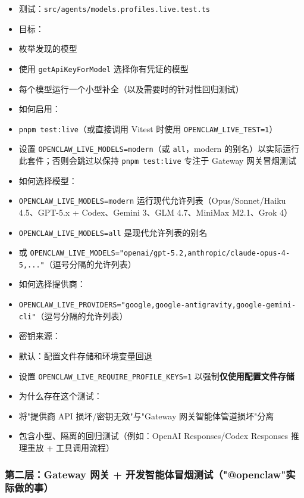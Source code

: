 \begin{itemize}
  \item 测试：\texttt{src/agents/models.profiles.live.test.ts}
  \item 目标：
  \item 枚举发现的模型
  \item 使用 \texttt{getApiKeyForModel} 选择你有凭证的模型
  \item 每个模型运行一个小型补全（以及需要时的针对性回归测试）
  \item 如何启用：
  \item \texttt{pnpm test:live}（或直接调用 Vitest 时使用 \texttt{OPENCLAW\_LIVE\_TEST=1}）
  \item 设置 \texttt{OPENCLAW\_LIVE\_MODELS=modern}（或 \texttt{all}，modern 的别名）以实际运行此套件；否则会跳过以保持 \texttt{pnpm test:live} 专注于 Gateway 网关冒烟测试
  \item 如何选择模型：
  \item \texttt{OPENCLAW\_LIVE\_MODELS=modern} 运行现代允许列表（Opus/Sonnet/Haiku 4.5、GPT-5.x + Codex、Gemini 3、GLM 4.7、MiniMax M2.1、Grok 4）
  \item \texttt{OPENCLAW\_LIVE\_MODELS=all} 是现代允许列表的别名
  \item 或 \texttt{OPENCLAW\_LIVE\_MODELS="openai/gpt-5.2,anthropic/claude-opus-4-5,..."}（逗号分隔的允许列表）
  \item 如何选择提供商：
  \item \texttt{OPENCLAW\_LIVE\_PROVIDERS="google,google-antigravity,google-gemini-cli"}（逗号分隔的允许列表）
  \item 密钥来源：
  \item 默认：配置文件存储和环境变量回退
  \item 设置 \texttt{OPENCLAW\_LIVE\_REQUIRE\_PROFILE\_KEYS=1} 以强制\textbf{仅使用配置文件存储}
  \item 为什么存在这个测试：
  \item 将"提供商 API 损坏/密钥无效"与"Gateway 网关智能体管道损坏"分离
  \item 包含小型、隔离的回归测试（例如：OpenAI Responses/Codex Responses 推理重放 + 工具调用流程）
\end{itemize}


\subsubsection{第二层：Gateway 网关 + 开发智能体冒烟测试（"@openclaw"实际做的事）}


